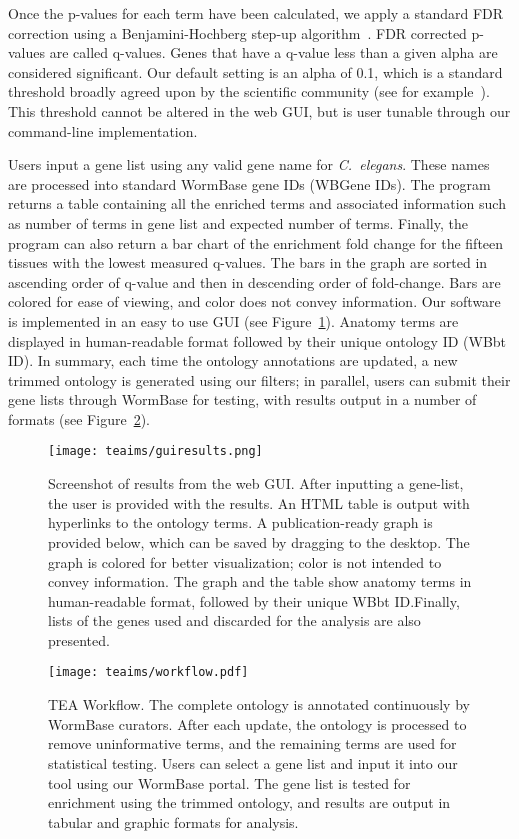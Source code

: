 Once the p-values for each term have been calculated, we apply a standard FDR
correction using a Benjamini-Hochberg step-up algorithm~\citep{Benjamini1995}.
FDR corrected p-values are called q-values. Genes that have a q-value less than
a given alpha are considered significant. Our default setting is an alpha of 0.1,
which is a standard threshold broadly agreed upon by the scientific community
(see for example~\citep{Love2014, Pawitan2005, Storey2003}). This threshold cannot
be altered in the web GUI, but is user tunable through our command-line
implementation.

Users input a gene list using any valid gene name for \emph{C.~elegans}. These
names are processed into standard WormBase gene IDs (WBGene IDs). The program
returns a table containing all the enriched terms and associated  information
such as number of terms in gene list and expected number of terms. Finally, the
program can also return a bar chart of the enrichment fold change for the fifteen
tissues with the lowest measured q-values. The bars in the graph are sorted in
ascending order of q-value and then in descending order of fold-change. Bars are
colored for ease of viewing, and color does not convey information. Our software
is implemented in an easy to use GUI (see Figure~\ref{fig:GUIresults}). Anatomy
terms are displayed in human-readable format followed by their unique ontology
ID (WBbt ID). In summary, each time the ontology annotations are updated, a new
trimmed ontology is generated using our filters; in parallel, users can submit
their gene lists through WormBase for testing, with results output in a number
of formats (see Figure~\ref{fig:workflow}).

\begin{figure}[htbp]
	\centering
    \texttt{[image: teaims/guiresults.png]}
 	\caption{
  Screenshot of results from the web GUI.
	After inputting a gene-list, the user is provided with the results. An HTML
  table is output with hyperlinks to the ontology terms. A publication-ready
  graph is provided below, which can be saved by  dragging to the desktop. The
  graph is colored for better visualization; color is not intended to convey
  information. The graph and the table show anatomy terms in  human-readable
  format, followed by their unique WBbt ID.\@ Finally, lists  of the genes used
  and discarded for the analysis are also presented.}
\label{fig:GUIresults}
\end{figure}

\begin{figure}[htbp]
	\centering
	\texttt{[image: teaims/workflow.pdf]}
	\caption{
	TEA Workflow.
	The complete ontology is annotated continuously by WormBase curators. After
  each update, the ontology is processed to remove uninformative terms, and the
  remaining terms are used for statistical testing.
	Users can select a gene list and input it into our tool using our WormBase
  portal. The gene list is tested for enrichment using the trimmed ontology, and
  results are output in tabular and graphic formats for analysis.}
\label{fig:workflow}
\end{figure}



